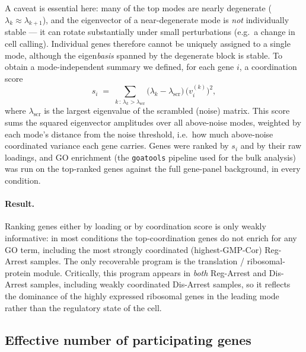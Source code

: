 A caveat is essential here: many of the top modes are nearly degenerate
($\lambda_k \approx \lambda_{k+1}$), and the eigenvector of a near-degenerate mode is
\emph{not} individually stable --- it can rotate substantially under small perturbations
(e.g.\ a change in cell calling).
Individual genes therefore cannot be uniquely assigned to a single mode, although the
eigen\emph{basis} spanned by the degenerate block is stable.
To obtain a mode-independent summary we defined, for each gene $i$, a coordination score
\begin{equation}
  s_i \;=\; \sum_{k \,:\, \lambda_k > \lambda_\mathrm{scr}}
            \bigl(\lambda_k - \lambda_\mathrm{scr}\bigr)\,
            \bigl(v_i^{(k)}\bigr)^{2},
\end{equation}
where $\lambda_\mathrm{scr}$ is the largest eigenvalue of the scrambled (noise) matrix.
This score sums the squared eigenvector amplitudes over all above-noise modes, weighted
by each mode's distance from the noise threshold, i.e.\ how much above-noise coordinated
variance each gene carries.
Genes were ranked by $s_i$ and by their raw loadings, and GO enrichment
(the \texttt{goatools} pipeline used for the bulk analysis) was run on the top-ranked
genes against the full gene-panel background, in every condition.

\paragraph{Result.}
Ranking genes either by loading or by coordination score is only weakly informative:
in most conditions the top-coordination genes do not enrich for any GO term, including
the most strongly coordinated (highest-GMP-Cor) Reg-Arrest samples.
The only recoverable program is the translation / ribosomal-protein module.
Critically, this program appears in \emph{both} Reg-Arrest and Dis-Arrest samples,
including weakly coordinated Dis-Arrest samples, so it reflects the dominance of the
highly expressed ribosomal genes in the leading mode rather than the regulatory state
of the cell.

\subsection*{Effective number of participating genes}

